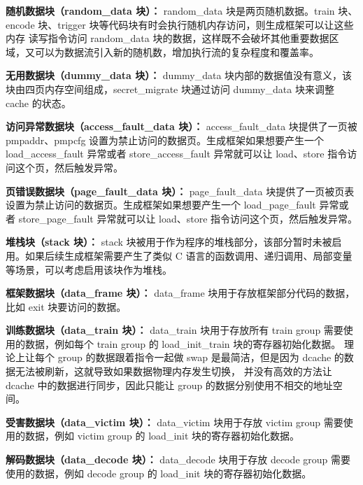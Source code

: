 \textbf{随机数据块（random\_data 块）：}
random\_data 块是两页随机数据。train 块、encode 块、trigger 块等代码块有时会执行随机内存访问，则生成框架可以让这些内存
读写指令访问 random\_data 块的数据，这样既不会破坏其他重要数据区域，又可以为数据流引入新的随机数，增加执行流的复杂程度和覆盖率。\par

\textbf{无用数据块（dummy\_data 块）：}
dummy\_data 块内部的数据值没有意义，该块由四页内存空间组成，secret\_migrate 块通过访问 dummy\_data 块来调整 cache 的状态。\par

\textbf{访问异常数据块（access\_fault\_data 块）：}
access\_fault\_data 块提供了一页被 pmpaddr、pmpcfg 设置为禁止访问的数据页。生成框架如果想要产生一个 load\_access\_fault 异常或者
store\_access\_fault 异常就可以让 load、store 指令访问这个页，然后触发异常。\par

\textbf{页错误数据块（page\_fault\_data 块）：}
page\_fault\_data 块提供了一页被页表设置为禁止访问的数据页。生成框架如果想要产生一个 load\_page\_fault 异常或者
store\_page\_fault 异常就可以让 load、store 指令访问这个页，然后触发异常。\par

\textbf{堆栈块（stack 块）：}
stack 块被用于作为程序的堆栈部分，该部分暂时未被启用。如果后续生成框架需要产生了类似 C 语言的函数调用、递归调用、局部变量等场景，可以考虑启用该块作为堆栈。\par

\textbf{框架数据块（data\_frame 块）：}
data\_frame 块用于存放框架部分代码的数据，比如 exit 块要访问的数据。\par

\textbf{训练数据块（data\_train 块）：}
data\_train 块用于存放所有 train group 需要使用的数据，例如每个 train group 的 load\_init\_train 块的寄存器初始化数据。
理论上让每个 group 的数据跟着指令一起做 swap 是最简洁，但是因为 dcache 的数据无法被刷新，这就导致如果数据物理内存发生切换，
并没有高效的方法让 dcache 中的数据进行同步，因此只能让 group 的数据分别使用不相交的地址空间。\par

\textbf{受害数据块（data\_victim 块）：}
data\_victim 块用于存放 victim group 需要使用的数据，例如 victim group 的 load\_init 块的寄存器初始化数据。\par

\textbf{解码数据块（data\_decode 块）：}
data\_decode 块用于存放 decode group 需要使用的数据，例如 decode group 的 load\_init 块的寄存器初始化数据。\par

